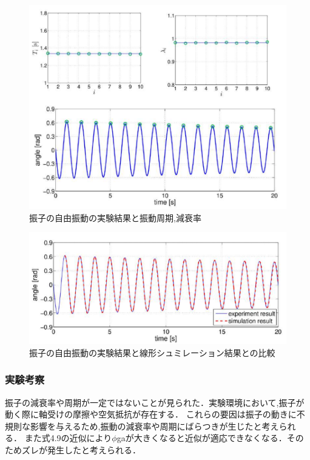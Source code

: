 \newpage

\begin{figure}[h]
  \centering
  \includegraphics[scale=0.7]{sozai/8.pdf}
  \caption{振子の自由振動の実験結果と振動周期,減衰率}
\end{figure}

\begin{figure}[h]
  \centering
  \includegraphics[scale=0.7]{sozai/9.pdf}
  \caption{振子の自由振動の実験結果と線形シュミレーション結果との比較}
\end{figure}

\subsubsection{実験考察}
振子の減衰率や周期が一定ではないことが見られた．実験環境において,振子が動く際に軸受けの摩擦や空気抵抗が存在する．
これらの要因は振子の動きに不規則な影響を与えるため,振動の減衰率や周期にばらつきが生じたと考えられる．
また式4.9の近似により\( \phi \)gaが大きくなると近似が適応できなくなる．そのためズレが発生したと考えられる．


